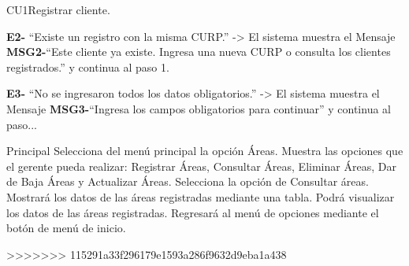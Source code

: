 \begin{UseCase}{CU1}{Registrar cliente.}
{				{\bf E2-} ``Existe un registro con la misma CURP.'' -> El sistema muestra el Mensaje {\bf MSG2-}``Este cliente ya existe. Ingresa una nueva CURP o consulta los clientes registrados.'' y continua al paso 1.
				
				{\bf E3-} ``No se ingresaron todos los datos obligatorios.'' -> El sistema muestra el Mensaje {\bf MSG3-}``Ingresa los campos obligatorios para continuar'' y continua al paso...}
	\end{UseCase}

	\begin{UCtrayectoria}{Principal}
		\UCpaso[\UCactor] Selecciona del menú principal la opción Áreas.
		\UCpaso Muestra las opciones que el gerente pueda realizar: Registrar Áreas, Consultar Áreas, 			Eliminar Áreas, Dar de Baja Áreas y Actualizar Áreas.
		\UCpaso[\UCactor] Selecciona la opción de Consultar áreas.
		\UCpaso Mostrará los datos de las áreas registradas mediante una tabla.
		\UCpaso[\UCactor] Podrá visualizar los datos de las áreas registradas.
		\UCpaso[\UCactor] Regresará al menú de opciones mediante el botón de menú de inicio.
				
	\end{UCtrayectoria}
>>>>>>> 115291a33f296179e1593a286f9632d9eba1a438
